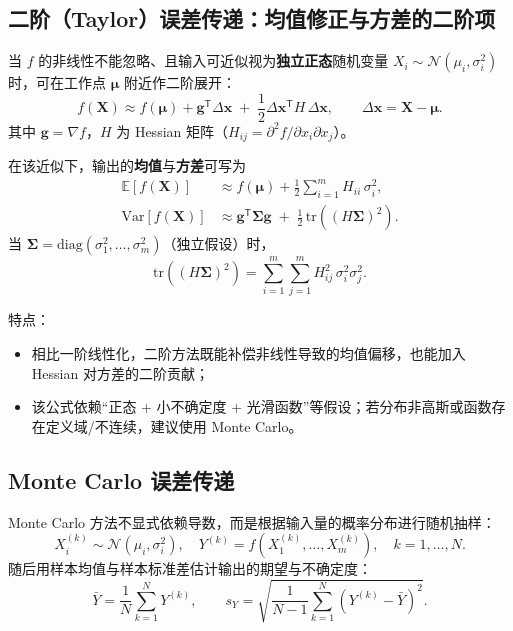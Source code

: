 \documentclass[UTF8,a4paper,11pt]{ctexart}
\begin{document}
\subsection{二阶（Taylor）误差传递：均值修正与方差的二阶项}

当 $f$ 的非线性不能忽略、且输入可近似视为\textbf{独立正态}随机变量
$X_i\sim\mathcal{N}(\mu_i,\sigma_i^2)$ 时，可在工作点 $\bm{\mu}$ 附近作二阶展开：
\begin{equation}
f(\bm{X})\approx f(\bm{\mu})+\bm{g}^\mathsf{T}\Delta\bm{x}
\;+\;\frac{1}{2}\Delta\bm{x}^\mathsf{T}H\,\Delta\bm{x},
\qquad \Delta\bm{x}=\bm{X}-\bm{\mu}.
\end{equation}
其中 $\bm{g}=\nabla f$，$H$ 为 Hessian 矩阵（$H_{ij}=\partial^2 f/\partial x_i\partial x_j$）。

在该近似下，输出的\textbf{均值}与\textbf{方差}可写为
\begin{align}
\mathbb{E}[f(\bm{X})] &\approx f(\bm{\mu})+\frac{1}{2}\sum_{i=1}^{m} H_{ii}\,\sigma_i^2,\\
\mathrm{Var}[f(\bm{X})] &\approx \bm{g}^\mathsf{T}\bm{\Sigma}\bm{g}
\;+\;\frac{1}{2}\,\mathrm{tr}\!\left((H\bm{\Sigma})^2\right).
\end{align}
当 $\bm{\Sigma}=\mathrm{diag}(\sigma_1^2,\ldots,\sigma_m^2)$（独立假设）时，
\begin{equation}
\mathrm{tr}\!\left((H\bm{\Sigma})^2\right)=\sum_{i=1}^{m}\sum_{j=1}^{m} H_{ij}^2\,\sigma_i^2\sigma_j^2.
\end{equation}

特点：
\begin{itemize}
  \item 相比一阶线性化，二阶方法既能补偿非线性导致的均值偏移，也能加入 Hessian 对方差的二阶贡献；
  \item 该公式依赖“正态 + 小不确定度 + 光滑函数”等假设；若分布非高斯或函数存在定义域/不连续，建议使用 Monte Carlo。
\end{itemize}

\subsection{Monte Carlo 误差传递}

Monte Carlo 方法不显式依赖导数，而是根据输入量的概率分布进行随机抽样：
\begin{equation}
X_i^{(k)}\sim \mathcal{N}(\mu_i,\sigma_i^2),\quad
Y^{(k)} = f\!\left(X_1^{(k)},\ldots,X_m^{(k)}\right),\quad k=1,\ldots,N.
\end{equation}
随后用样本均值与样本标准差估计输出的期望与不确定度：
\begin{equation}
\bar{Y}=\frac{1}{N}\sum_{k=1}^{N}Y^{(k)},\qquad
s_Y=\sqrt{\frac{1}{N-1}\sum_{k=1}^{N}\left(Y^{(k)}-\bar{Y}\right)^2}.
\end{equation}
\end{document}
